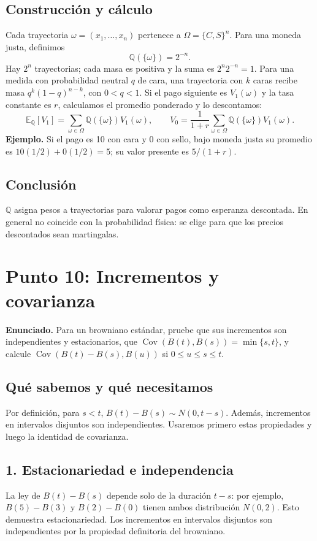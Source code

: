 \documentclass[11pt, a4paper]{article}
\begin{document}
\subsection*{Construcción y cálculo}
Cada trayectoria \(\omega=(x_1,\ldots,x_n)\) pertenece a \(\Omega=\{C,S\}^n\). Para una moneda justa, definimos
\[
\mathbb{Q}(\{\omega\})=2^{-n}.
\]
Hay \(2^n\) trayectorias; cada masa es positiva y la suma es \(2^n2^{-n}=1\). Para una medida con probabilidad neutral \(q\) de cara, una trayectoria con \(k\) caras recibe masa \(q^k(1-q)^{n-k}\), con \(0<q<1\).
Si el pago siguiente es \(V_1(\omega)\) y la tasa constante es \(r\), calculamos el promedio ponderado y lo descontamos:
\[
\mathbb{E}_{\mathbb{Q}}[V_1]=\sum_{\omega\in\Omega}\mathbb{Q}(\{\omega\})V_1(\omega),\qquad
V_0=\frac{1}{1+r}\sum_{\omega\in\Omega}\mathbb{Q}(\{\omega\})V_1(\omega).
\]
\textbf{Ejemplo.} Si el pago es 10 con cara y 0 con sello, bajo moneda justa su promedio es \(10(1/2)+0(1/2)=5\); su valor presente es \(5/(1+r)\).

\subsection*{Conclusión}
\(\mathbb{Q}\) asigna pesos a trayectorias para valorar pagos como esperanza descontada. En general no coincide con la probabilidad física: se elige para que los precios descontados sean martingalas.

\newpage
\section*{Punto 10: Incrementos y covarianza}
\textbf{Enunciado.} Para un browniano estándar, pruebe que sus incrementos son independientes y estacionarios, que \(\operatorname{Cov}(B(t),B(s))=\min\{s,t\}\), y calcule \(\operatorname{Cov}(B(t)-B(s),B(u))\) si \(0\le u\le s\le t\).

\subsection*{Qué sabemos y qué necesitamos}
Por definición, para \(s<t\), \(B(t)-B(s)\sim N(0,t-s)\). Además, incrementos en intervalos disjuntos son independientes. Usaremos primero estas propiedades y luego la identidad de covarianza.

\subsection*{1. Estacionariedad e independencia}
La ley de \(B(t)-B(s)\) depende solo de la duración \(t-s\): por ejemplo, \(B(5)-B(3)\) y \(B(2)-B(0)\) tienen ambos distribución \(N(0,2)\). Esto demuestra estacionariedad. Los incrementos en intervalos disjuntos son independientes por la propiedad definitoria del browniano.
\end{document}
